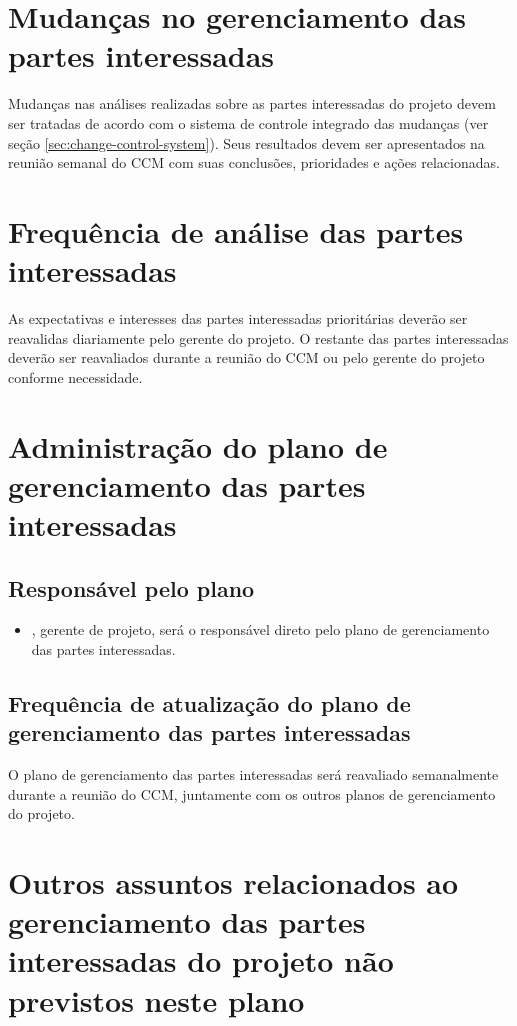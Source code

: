 \section{Mudanças no gerenciamento das partes interessadas}

Mudanças nas análises realizadas sobre as partes interessadas do projeto devem ser tratadas de acordo com o sistema de controle integrado das mudanças (ver seção \ref{sec:change-control-system}). Seus resultados devem ser apresentados na reunião semanal do CCM com suas conclusões, prioridades e ações relacionadas.

\section{Frequência de análise das partes interessadas}

As expectativas e interesses das partes interessadas prioritárias deverão ser reavalidas diariamente pelo gerente do projeto. O restante das partes interessadas deverão ser reavaliados durante a reunião do CCM ou pelo gerente do projeto conforme necessidade.

\section{Administração do plano de gerenciamento das partes interessadas}

\subsection{Responsável pelo plano}

\begin{itemize}
	\item \projectManagerName{}, gerente de projeto, será o responsável direto pelo plano de gerenciamento das partes interessadas.
\end{itemize}

\subsection{Frequência de atualização do plano de gerenciamento das partes interessadas}

O plano de gerenciamento das partes interessadas será reavaliado semanalmente durante a reunião do CCM, juntamente com os outros planos de gerenciamento do projeto.

\section{Outros assuntos relacionados ao gerenciamento das partes interessadas do projeto não previstos neste plano}

